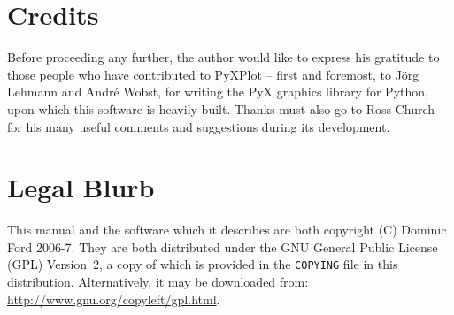 \section{Credits}

Before proceeding any further, the author would like to express his gratitude
to those people who have contributed to PyXPlot -- first and foremost, to
J\"org Lehmann and Andr\'e Wobst, for writing the PyX graphics library for
Python, upon which this software is heavily built. Thanks must also go to Ross
Church for his many useful comments and suggestions during its development.

\section{Legal Blurb}

This manual and the software which it describes are both copyright (C)
Dominic Ford 2006-7. They are both distributed under the GNU General Public
License (GPL) Version~2, a copy of which is provided in the \texttt{COPYING}
file in this distribution. Alternatively, it may
be downloaded from:\\ \url{http://www.gnu.org/copyleft/gpl.html}.

